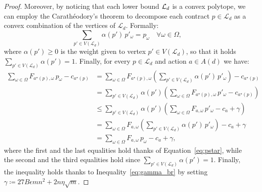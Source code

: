 \begin{proof}
 	Moreover, by noticing that each lower bound $\mathcal{L}_d$ is a convex polytope, we can employ the Carathéodory's theorem to decompose each contract $p \in \mathcal{L}_{d}$ as a convex combination of the vertices of $\mathcal{L}_{d}$. Formally:
	\begin{equation}\label{eq:pstar}
		\sum_{p' \in V(\mathcal{L}_{d}) } \alpha(p') \, p'_\omega = p_\omega \quad \forall \omega \in \Omega,
	\end{equation}
	where $\alpha(p') \ge 0$ is the weight given to vertex $p' \in V(\mathcal{L}_{d}) $, so that it holds $\sum_{p' \in V(\mathcal{L}_{d})} \alpha(p') = 1$.
	Finally, for every $p \in \mathcal{L}_{d}$ and action $a \in A(d)$ we have:
	\begin{align*}
		\sum_{\omega  \in \Omega }  F_{a^\star(p),\omega}  \, {p}_\omega - c_{a^\star(p)} & =  \sum_{\omega  \in \Omega } F_{a^\star(p),\omega}  \left( \sum_{p' \in V(\mathcal{L}_{d}) } \alpha(p') \, p'_\omega \right) - c_{a^\star(p)} \\
		& = \sum_{p' \in V(\mathcal{L}_{d}) } \alpha(p') \left( \sum_{\omega  \in \Omega }  F_{a^\star(p),\omega} \, p'_\omega - c_{a^\star(p)} \right) \\
		& \le \sum_{p' \in V(\mathcal{L}_{d}) } \alpha(p') \left( \sum_{\omega  \in \Omega }  {F}_{a,\omega} \, p'_\omega - c_{a} + \gamma\right)    \\
		& =  \sum_{\omega  \in \Omega } {F}_{a,\omega}  \left( \sum_{p' \in V(\mathcal{L}_{d}) } \alpha(p') \, p'_\omega \right) - c_{a} + \gamma\\
		& =  \sum_{\omega  \in \Omega }  {F}_{a,\omega} \, p_\omega  - c_{a} + \gamma,
	\end{align*}
	where the first and the last equalities hold thanks of Equation~\eqref{eq:pstar}, while the second and the third equalities hold since $\sum_{p' \in V(\mathcal{L}_{d})} \alpha(p') = 1$. Finally, the inequality holds thanks to Inequality~\eqref{eq:gamma_br} by setting $\gamma \coloneqq 27 B \epsilon m n^2 + 2  n \eta \sqrt{m}$.
\end{proof}



